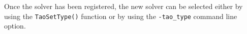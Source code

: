 \documentclass[]{book}
\begin{document}
Once the solver has been registered, the new solver can be selected 
either by using the \texttt{TaoSetType()} function or by using the \texttt{-tao\_type} command line option.




\newpage

%




\end{document}
